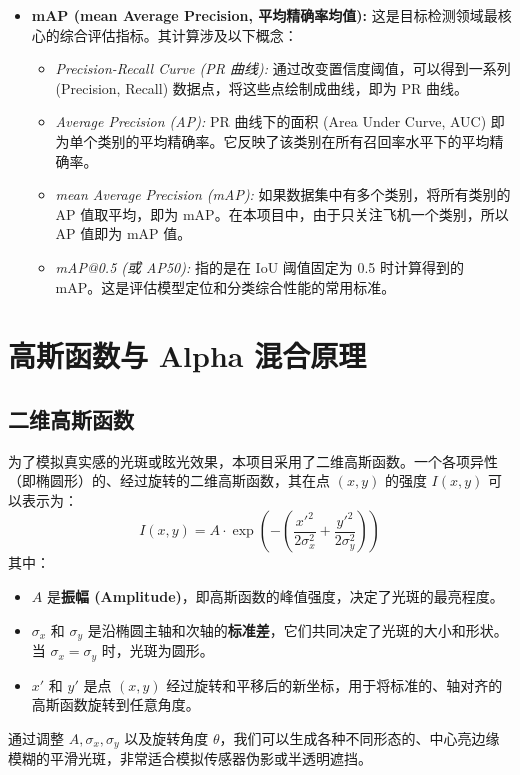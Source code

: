 \documentclass[12pt, a4paper]{report}
\begin{document}
\begin{itemize}
    \item \textbf{mAP (mean Average Precision, 平均精确率均值):} 这是目标检测领域最核心的综合评估指标。其计算涉及以下概念：
        \begin{itemize}
            \item \textit{Precision-Recall Curve (PR 曲线):} 通过改变置信度阈值，可以得到一系列 (Precision, Recall) 数据点，将这些点绘制成曲线，即为 PR 曲线。
            \item \textit{Average Precision (AP):} PR 曲线下的面积 (Area Under Curve, AUC) 即为单个类别的平均精确率。它反映了该类别在所有召回率水平下的平均精确率。
            \item \textit{mean Average Precision (mAP):} 如果数据集中有多个类别，将所有类别的 AP 值取平均，即为 mAP。在本项目中，由于只关注飞机一个类别，所以 AP 值即为 mAP 值。
            \item \textit{mAP@0.5 (或 AP50):} 指的是在 IoU 阈值固定为 0.5 时计算得到的 mAP。这是评估模型定位和分类综合性能的常用标准。
        \end{itemize}
    \cite{focal_loss}
\end{itemize}

\section{高斯函数与 Alpha 混合原理}
\subsection{二维高斯函数}
为了模拟真实感的光斑或眩光效果，本项目采用了二维高斯函数。一个各项异性（即椭圆形）的、经过旋转的二维高斯函数，其在点 $(x, y)$ 的强度 $I(x, y)$ 可以表示为：
\begin{equation}
    I(x,y) = A \cdot \exp \left( - \left( \frac{x'^2}{2\sigma_x^2} + \frac{y'^2}{2\sigma_y^2} \right) \right)
\end{equation}
其中：
\begin{itemize}
    \item $A$ 是\textbf{振幅 (Amplitude)}，即高斯函数的峰值强度，决定了光斑的最亮程度。
    \item $\sigma_x$ 和 $\sigma_y$ 是沿椭圆主轴和次轴的\textbf{标准差}，它们共同决定了光斑的大小和形状。当 $\sigma_x = \sigma_y$ 时，光斑为圆形。
    \item $x'$ 和 $y'$ 是点 $(x, y)$ 经过旋转和平移后的新坐标，用于将标准的、轴对齐的高斯函数旋转到任意角度。
\end{itemize}
通过调整 $A, \sigma_x, \sigma_y$ 以及旋转角度 $\theta$，我们可以生成各种不同形态的、中心亮边缘模糊的平滑光斑，非常适合模拟传感器伪影或半透明遮挡。
\end{document}
